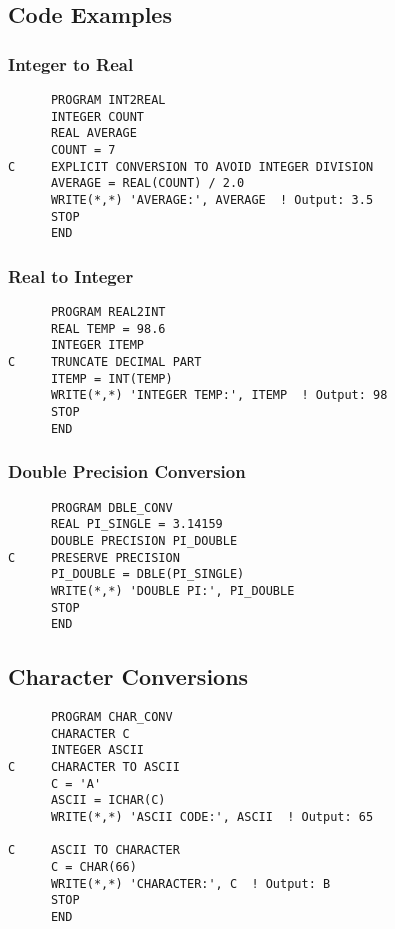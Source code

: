 \documentclass{book}
\begin{document}
\subsection*{Code Examples}

\subsubsection*{Integer to Real}
\begin{verbatim}
      PROGRAM INT2REAL
      INTEGER COUNT
      REAL AVERAGE
      COUNT = 7
C     EXPLICIT CONVERSION TO AVOID INTEGER DIVISION
      AVERAGE = REAL(COUNT) / 2.0
      WRITE(*,*) 'AVERAGE:', AVERAGE  ! Output: 3.5
      STOP
      END
\end{verbatim}

\subsubsection*{Real to Integer}
\begin{verbatim}
      PROGRAM REAL2INT
      REAL TEMP = 98.6
      INTEGER ITEMP
C     TRUNCATE DECIMAL PART
      ITEMP = INT(TEMP)
      WRITE(*,*) 'INTEGER TEMP:', ITEMP  ! Output: 98
      STOP
      END
\end{verbatim}

\subsubsection*{Double Precision Conversion}
\begin{verbatim}
      PROGRAM DBLE_CONV
      REAL PI_SINGLE = 3.14159
      DOUBLE PRECISION PI_DOUBLE
C     PRESERVE PRECISION
      PI_DOUBLE = DBLE(PI_SINGLE)
      WRITE(*,*) 'DOUBLE PI:', PI_DOUBLE
      STOP
      END
\end{verbatim}

\subsection*{Character Conversions}
\begin{verbatim}
      PROGRAM CHAR_CONV
      CHARACTER C
      INTEGER ASCII
C     CHARACTER TO ASCII
      C = 'A'
      ASCII = ICHAR(C)
      WRITE(*,*) 'ASCII CODE:', ASCII  ! Output: 65
      
C     ASCII TO CHARACTER
      C = CHAR(66)
      WRITE(*,*) 'CHARACTER:', C  ! Output: B
      STOP
      END
\end{verbatim}
\end{document}

